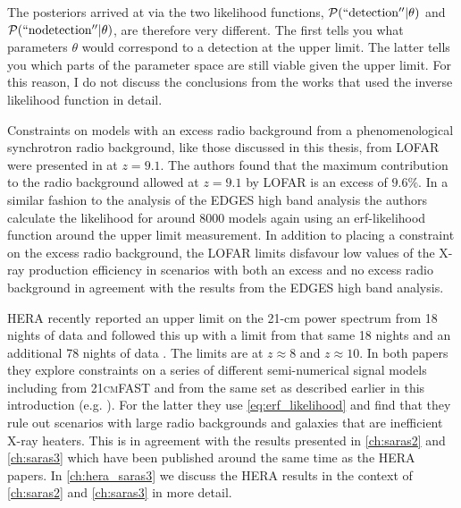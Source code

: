 The posteriors arrived at via the two likelihood functions, $\mathcal{P}(\mathrm{``detection''}|\theta)$ and $\mathcal{P}(\mathrm{``no detection''}|\theta)$, are therefore very different. The first tells you what parameters $\theta$ would correspond to a detection at the upper limit. The latter tells you which parts of the parameter space are still viable given the upper limit. For this reason, I do not discuss the conclusions from the works that used the inverse likelihood function in detail.

Constraints on models with an excess radio background from a phenomenological synchrotron radio background, like those discussed in this thesis, from LOFAR were presented in \cite{Mondal_LOFAR_2020} at $z=9.1$. The authors found that the maximum contribution to the radio background allowed at $z=9.1$ by LOFAR is an excess of $9.6\%$. In a similar fashion to the analysis of the EDGES high band analysis the authors calculate the likelihood for around 8000 models again using an erf-likelihood function around the upper limit measurement. In addition to placing a constraint on the excess radio background, the LOFAR limits disfavour low values of the X-ray production efficiency in scenarios with both an excess and no excess radio background in agreement with the results from the EDGES high band analysis.

HERA recently reported an upper limit on the 21-cm power spectrum from 18 nights of data \cite{HERA_2022b} and followed this up with a limit from that same 18 nights and an additional 78 nights of data \cite{HERA_2022c}. The limits are at $z\approx8$ and $z\approx10$. In both papers they explore constraints on a series of different semi-numerical signal models including from \textsc{21cmFAST} and from the same set as described earlier in this introduction (e.g. \cite{Reis2020, Fialkov2019}). For the latter they use \cref{eq:erf_likelihood} and find that they rule out scenarios with large radio backgrounds and galaxies that are inefficient X-ray heaters. This is in agreement with the results presented in \cref{ch:saras2} and \cref{ch:saras3} which have been published around the same time as the HERA papers. In \cref{ch:hera_saras3} we discuss the HERA results in the context of \cref{ch:saras2} and \cref{ch:saras3} in more detail.


